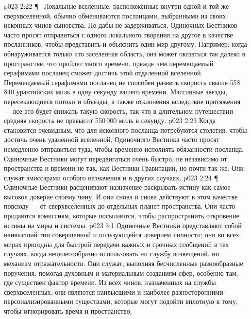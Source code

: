 \vs p023 2:22 \P\ \bibnobreakspace {} Локальные вселенные, расположенные внутри одной и той же сверхвселенной, обычно обмениваются посланцами, выбранными из своих исконных чинов сыновства. Но дабы не задерживаться, Одиночных Вестников часто просят отправиться с одного локального творения на другое в качестве посланников, чтобы представить и объяснить один мир другому. Например: когда обнаруживается только что заселенная область, она может оказаться так далеко в пространстве, что пройдет много времени, прежде чем перемещаемый серафимами посланец сможет достичь этой отдаленной вселенной. Перемещаемый серафимами посланец не способен развить скорость свыше 558\,840 урантийских миль в одну секунду вашего времени. Массивные звезды, пересекающиеся потоки и объезды, а также отклонения вследствие притяжения --- все это будет снижать такую скорость, так что в длительном путешествии средняя скорость не превысит 550\,000 миль в секунду.
\vs p023 2:23 Когда становится очевидным, что для исконного посланца потребуются столетия, чтобы достичь очень удаленной вселенной, Одиночного Вестника часто просят немедленно отправиться туда, чтобы временно исполнять обязанности посланца. Одиночные Вестники могут передвигаться очень быстро, не независимо от пространства и времени не так, как Вестники Гравитации, но почти так же. Они служат эмиссарами особого назначения и в других случаях.
\vs p023 2:24 \P\ \bibnobreakspace {} Одиночные Вестники расценивают назначение раскрывать истину как самое высокое доверие своему чину. И они снова и снова действуют в этом качестве повсюду --- от сверхвселенных до отдельных планет пространства. Они часто придаются комиссиям, которые посылаются, чтобы распространить откровение истины на миры и системы.
\vs p023 3:1 Одиночные Вестники представляют собой наивысший тип совершенной и пользующейся доверием личности; они во всех мирах пригодны для быстрой передачи важных и срочных сообщений в тех случаях, когда нецелесообразно использовать ни службу возвещений, ни механизм отражательности. Они служат, выполняя бесчисленные разнообразные поручения, помогая духовным и материальным созданиям сфер, особенно там, где существен фактор времени. Из всех чинов, назначенных на службы сверхвселенных, они являются наивысшими и наиболее разносторонними персонализированными существами, которые могут подойти вплотную к тому, чтобы игнорировать время и пространство.

